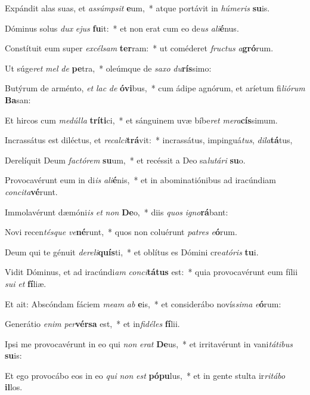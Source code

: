 \item Expándit alas suas, et \textit{as}\textit{súmp}\textit{sit} \textbf{e}um,~* atque portávit in \textit{hú}\textit{me}\textit{ris} \textbf{su}is.
\item Dóminus solus \textit{dux} \textit{e}\textit{jus} \textbf{fu}it:~* et non erat cum eo de\textit{us} \textit{a}\textit{li}\textbf{é}nus.
\item Constítuit eum super \textit{ex}\textit{cél}\textit{sam} \textbf{ter}ram:~* ut coméderet \textit{fruc}\textit{tus} \textit{a}\textbf{gró}rum.
\item Ut súge\textit{ret} \textit{mel} \textit{de} \textbf{pe}tra,~* oleúmque de \textit{sa}\textit{xo} \textit{du}\textbf{rís}simo:
\item Butýrum de arménto, \textit{et} \textit{lac} \textit{de} \textbf{ó}\textbf{vi}bus,~* cum ádipe agnórum, et aríetum fi\textit{li}\textit{ó}\textit{rum} \textbf{Ba}san:
\item Et hircos cum \textit{me}\textit{dúl}\textit{la} \textbf{trí}\textbf{ti}ci,~* et sánguinem uvæ bíbe\textit{ret} \textit{me}\textit{ra}\textbf{cís}simum.
\item Incrassátus est diléctus, et \textit{re}\textit{cal}\textit{ci}\textbf{trá}vit:~* incrassátus, impinguá\textit{tus}, \textit{di}\textit{la}\textbf{tá}tus,
\item Derelíquit Deum \textit{fac}\textit{tó}\textit{rem} \textbf{su}um,~* et recéssit a Deo sa\textit{lu}\textit{tá}\textit{ri} \textbf{su}o.
\item Provocavérunt eum in di\textit{is} \textit{a}\textit{li}\textbf{é}nis,~* et in abominatiónibus ad iracúndiam \textit{con}\textit{ci}\textit{ta}\textbf{vé}runt.
\item Immolavérunt dæmóni\textit{is} \textit{et} \textit{non} \textbf{De}o,~* diis \textit{quos} \textit{i}\textit{gno}\textbf{rá}bant:
\item Novi recen\textit{tés}\textit{que} \textit{ve}\textbf{né}runt,~* quos non coluérunt \textit{pa}\textit{tres} \textit{e}\textbf{ó}rum.
\item Deum qui te génuit \textit{de}\textit{re}\textit{li}\textbf{quís}ti,~* et oblítus es Dómini cre\textit{a}\textit{tó}\textit{ris} \textbf{tu}i.
\item Vidit Dóminus, et ad iracúndi\textit{am} \textit{con}\textit{ci}\textbf{tá}\textbf{tus} est:~* quia provocavérunt eum fílii \textit{su}\textit{i} \textit{et} \textbf{fí}liæ.
\item Et ait: Abscóndam fáciem \textit{me}\textit{am} \textit{ab} \textbf{e}is,~* et considerábo novís\textit{si}\textit{ma} \textit{e}\textbf{ó}rum:
\item Generátio \textit{e}\textit{nim} \textit{per}\textbf{vér}\textbf{sa} est,~* et in\textit{fi}\textit{dé}\textit{les} \textbf{fí}lii.
\item Ipsi me provocavérunt in eo qui \textit{non} \textit{e}\textit{rat} \textbf{De}us,~* et irritavérunt in vani\textit{tá}\textit{ti}\textit{bus} \textbf{su}is:
\item Et ego provocábo eos in eo \textit{qui} \textit{non} \textit{est} \textbf{pó}\textbf{pu}lus,~* et in gente stulta ir\textit{ri}\textit{tá}\textit{bo} \textbf{il}los.
